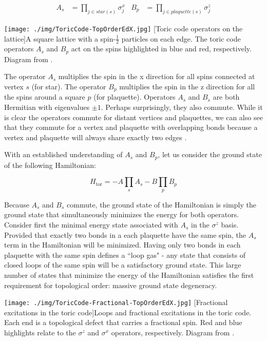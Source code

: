 \begin{align*}
A_s&=\prod_{j \in star(s)} \sigma^{x}_{j} 		& B_{p}&=\prod_{j \in plaquette(s)} \sigma^{z}_{j}
\end{align*}

\begin{centering}
\texttt{[image: ./img/ToricCode-TopOrderEdX.jpg]}
  \captionsetup{width=0.9\textwidth}
  [Toric code operators on the lattice]{A square lattice with a spin-$\frac{1}{2}$ particles on each edge. The toric code operators $A_{s}$ and $B_{p}$ act on the spins highlighted in blue and red, respectively. Diagram from \cite{topOrderEdX}.}
  \label{fig:toricCode1}
\end{centering}

The operator $A_{s}$ multiplies the spin in the x direction for all spins connected at vertex $s$ (for star). The operator $B_{p}$ multiplies the spin in the z direction for all the spins around a square $p$ (for plaquette). Operators $A_{s}$ and $B_{s}$ are both Hermitian with eigenvalues $\pm 1$. Perhaps surprisingly, they also commute. While it is clear the operators commute for distant vertices and plaquettes, we can also see that they commute for a vertex and plaquette with overlapping bonds because a vertex and plaquette will always share exactly two edges \cite{Kitaev2003}.

With an established understanding of $A_{s}$ and $B_{p}$, let us consider the ground state of the following Hamiltonian:

\begin{equation}
H_{\text{tor}} = -A \prod_{s} A_{s} - B \prod_{p} B_{p}
\end{equation}

Because $A_{s}$ and $B_{s}$ commute, the ground state of the Hamiltonian is simply the ground state that simultaneously minimizes the energy for both operators. Consider first the minimal energy state associated with $A_{s}$ in the $\sigma^{z}$ basis. Provided that exactly two bonds in a each plaquette have the same spin, the $A_{s}$ term in the Hamiltonian will be minimized. Having only two bonds in each plaquette with the same spin defines a ``loop gas" - any state that consists of closed loops of the same spin will be a satisfactory ground state. This large number of states that minimize the energy of the Hamiltonian satisfies the first requirement for topological order: massive ground state degeneracy.

\begin{centering}
\texttt{[image: ./img/ToricCode-Fractional-TopOrderEdX.jpg]}
  \captionsetup{width=0.75\textwidth}
  [Fractional excitations in the toric code]{Loops and fractional excitations in the toric code. Each end is a topological defect that carries a fractional spin. Red and blue highlights relate to the $\sigma^{z}$ and $\sigma^{x}$ operators, respectively. Diagram from \cite{topOrderEdX}.}
  \label{fig:toricCode2}
\end{centering}

